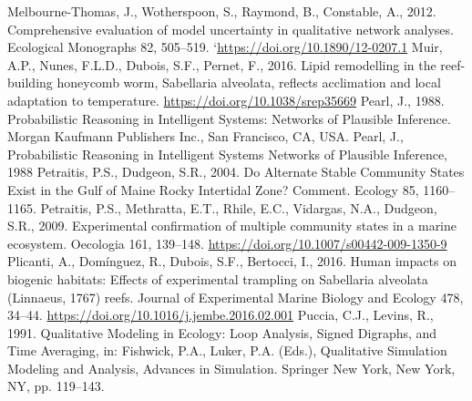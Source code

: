 \documentclass[12pt]{report}
\begin{document}
\begin{singlespacing}
\newline\newline
Melbourne-Thomas, J., Wotherspoon, S., Raymond, B., Constable, A., 2012. Comprehensive evaluation of model uncertainty in qualitative network analyses. Ecological Monographs 82, 505–519. `\href{https://doi.org/10.1890/12-0207.1}{https://doi.org/10.1890/12-0207.1}
\newline\newline
Muir, A.P., Nunes, F.L.D., Dubois, S.F., Pernet, F., 2016. Lipid remodelling in the reef-building honeycomb worm, Sabellaria alveolata, reflects acclimation and local adaptation to temperature. \href{https://doi.org/10.1038/srep35669}{https://doi.org/10.1038/srep35669}
\newline\newline
Pearl, J., 1988. Probabilistic Reasoning in Intelligent Systems: Networks of Plausible Inference. Morgan Kaufmann Publishers Inc., San Francisco, CA, USA.
\newline\newline
Pearl, J., Probabilistic Reasoning in Intelligent Systems Networks of Plausible Inference, 1988
\newline\newline
Petraitis, P.S., Dudgeon, S.R., 2004. Do Alternate Stable Community States Exist in the Gulf of Maine Rocky Intertidal Zone? Comment. Ecology 85, 1160–1165.
\newline\newline
Petraitis, P.S., Methratta, E.T., Rhile, E.C., Vidargas, N.A., Dudgeon, S.R., 2009. Experimental confirmation of multiple community states in a marine ecosystem. Oecologia 161, 139–148. \href{https://doi.org/10.1007/s00442-009-1350-9}{https://doi.org/10.1007/s00442-009-1350-9}
\newline\newline
Plicanti, A., Domínguez, R., Dubois, S.F., Bertocci, I., 2016. Human impacts on biogenic habitats: Effects of experimental trampling on Sabellaria alveolata (Linnaeus, 1767) reefs. Journal of Experimental Marine Biology and Ecology 478, 34–44. \href{https://doi.org/10.1016/j.jembe.2016.02.001}{https://doi.org/10.1016/j.jembe.2016.02.001}
\newline\newline
Puccia, C.J., Levins, R., 1991. Qualitative Modeling in Ecology: Loop Analysis, Signed Digraphs, and Time Averaging, in: Fishwick, P.A., Luker, P.A. (Eds.), Qualitative Simulation Modeling and Analysis, Advances in Simulation. Springer New York, New York, NY, pp. 119–143. \newline

\end{singlespacing}
\end{document}
